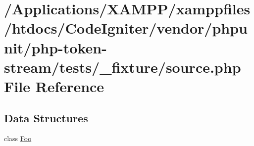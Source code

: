 \hypertarget{phpunit_2php-token-stream_2tests_2__fixture_2_source_8php}{}\section{/\+Applications/\+X\+A\+M\+P\+P/xamppfiles/htdocs/\+Code\+Igniter/vendor/phpunit/php-\/token-\/stream/tests/\+\_\+fixture/source.php File Reference}
\label{phpunit_2php-token-stream_2tests_2__fixture_2_source_8php}
\subsection*{Data Structures}
\begin{DoxyCompactItemize}
\item 
class \mbox{\hyperlink{class_foo}{Foo}}
\end{DoxyCompactItemize}
